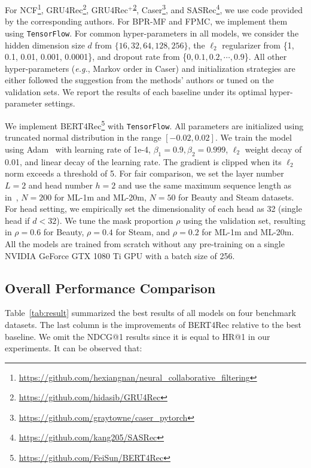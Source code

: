 For NCF\footnote{\url{https://github.com/hexiangnan/neural_collaborative_filtering}}, GRU4Rec\footnote{\label{gru4rec}\url{https://github.com/hidasib/GRU4Rec}}, GRU4Rec$^+$\textsuperscript{\ref{gru4rec}}, Caser\footnote{\url{https://github.com/graytowne/caser_pytorch}}, and SASRec\footnote{\url{https://github.com/kang205/SASRec}}, we use code provided by the corresponding authors. For BPR-MF and FPMC, we implement them using \texttt{TensorFlow}.
For common hyper-parameters in all models, we consider the hidden dimension size $d$ from $\{16, 32, 64, 128, 256\}$, the $\ell_2$ regularizer from \{1, 0.1, 0.01, 0.001, 0.0001\}, and dropout rate from \{$0, 0.1, 0.2,\cdots, 0.9$\}.
All other hyper-parameters (\textit{e.g.}, Markov order in Caser) and initialization strategies are either followed the suggestion from the methods' authors or tuned on the validation sets. We report the results of each baseline under its optimal hyper-parameter settings.

We implement BERT4Rec\footnote{\url{https://github.com/FeiSun/BERT4Rec}} with \texttt{TensorFlow}.
All parameters are initialized using truncated normal distribution in the range $[-0.02, 0.02]$. We train the model using Adam~\cite{Kingma:iclr2015:Adam} with learning rate of 1e-4, $\beta_1 = 0.9, \beta_2 = 0.999$, $\ell_2$ weight decay of 0.01, and linear decay of the learning rate. The gradient is clipped when its $\ell_2$ norm exceeds a threshold of 5. For fair comparison, we set the layer number $L=2$ and head number $h=2$ and use the same maximum sequence length as in~\cite{Kang:ICDM2018:SAS}, $N=200$ for ML-1m and ML-20m, $N=50$ for Beauty and Steam datasets. For head setting, we empirically set the dimensionality of each head as 32 (single head if $d<32$). We tune the mask proportion $\rho$ using the validation set, resulting in $\rho=0.6$ for Beauty, $\rho=0.4$ for Steam, and $\rho=0.2$ for ML-1m and ML-20m. All the models are trained from scratch without any pre-training on a single NVIDIA GeForce GTX 1080 Ti GPU with a batch size of 256.

\subsection{Overall Performance Comparison}

Table~\ref{tab:result} summarized the best results of all models on four benchmark datasets. The last column is the improvements of BERT4Rec relative to the best baseline. We omit the NDCG@1 results since it is equal to HR@1 in our experiments. It can be observed that:

